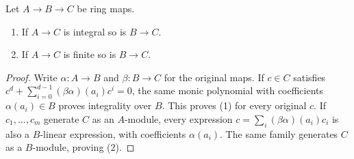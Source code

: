 \begin{lemma}
\label{lemma-integral-permanence}
Let $A \to B \to C$ be ring maps.
\begin{enumerate}
\item If $A \to C$ is integral so is $B \to C$.
\item If $A \to C$ is finite so is $B \to C$.
\end{enumerate}
\end{lemma}

\begin{proof}
Write $\alpha:A\to B$ and $\beta:B\to C$ for the original maps.
If $c\in C$ satisfies
$c^d+\sum_{i=0}^{d-1}(\beta\alpha)(a_i)c^i=0$, the same monic
polynomial with coefficients $\alpha(a_i)\in B$ proves integrality
over $B$. This proves (1) for every original $c$.
If $c_1,\ldots,c_m$ generate $C$ as an $A$-module, every expression
$c=\sum_i(\beta\alpha)(a_i)c_i$ is also a $B$-linear expression,
with coefficients $\alpha(a_i)$. The same family generates $C$
as a $B$-module, proving (2).
\end{proof}
